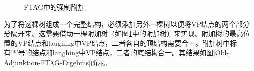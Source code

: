 \begin{figure}
\caption{\label{Obl-Adjunktion-FTAG}FTAG中的强制附加}
\end{figure}%
为了将这棵树组成一个完整结构，必须添加另外一棵树以便将VP结点的两个部分分隔开来。这需要借助一棵附加树（如图\ref{Obl-Adjunktion-FTAG}中的附加树）来实现。附加树的最高位置的VP结点和laughing中VP结点，二者各自的顶结构需要合一。附加树中标有`*'号的结点和laughing中VP结点，二者的底结构合一。其结果如图\vref{Obl-Adjunktion-FTAG-Ergebnis}所示。

